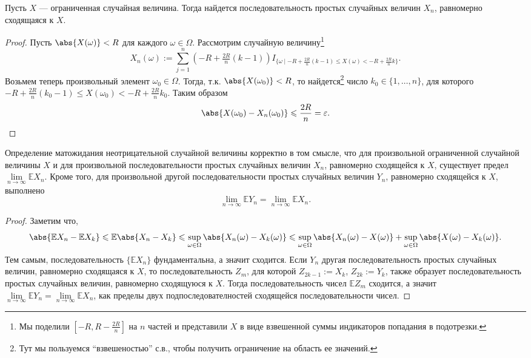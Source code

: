 \begin{lemma*}
    Пусть $X$ --- ограниченная случайная величина.
    Тогда найдется последовательность простых случайных величин $X_n$, равномерно сходящаяся к $X$.
\end{lemma*}

\begin{proof}
    Пусть $\abs{X(\omega)} < R$ для каждого $\omega \in \Omega$.
    Рассмотрим случайную величину\footnote{Мы поделили $[-R, R - \frac{2R}{n}]$ на $n$ частей и представили $X$ в виде взвешенной суммы индикаторов попадания в подотрезки.}
    \[
        X_n(\omega) := \sum_{j = 1}^{n}(-R + \tfrac{2R}{n}(k - 1)) I_{\{\omega \mid -R + \frac{2R}{n}(k - 1) \leqslant X(\omega)< -R + \frac{2R}{n} k\}}.
    \]
    Возьмем теперь произвольный элемент $\omega_0 \in \Omega$.
    Тогда, т.к. $\abs{X(\omega_0)} < R$, то найдется\footnote{Тут мы пользуемся \enquote{взвешеностью} с.в., чтобы получить ограничение на область ее значений.} число $k_0 \in \{1, \ldots, n \}$, для которого $-R + \frac{2R}{n}(k_0 - 1) \leqslant X(\omega_0) < -R + \frac{2R}{n} k_0$.
    Таким образом
    \[
        \abs{X(\omega_0) - X_n(\omega_0)} \leqslant \frac{2R}{n} = \varepsilon.
    \]
\end{proof}

\begin{proposal*}
    Определение матожидания неотрицательной случайной величины корректно в том смысле, что для произвольной ограниченной случайной величины $X$ и для произвольной последовательности простых случайных величин $X_n$, равномерно сходящейся к $X$, существует предел $\lim\limits_{n \to \infty} \mathbb{E} X_n$.
    Кроме того, для произвольной другой последовательности простых случайных величин $Y_n$, равномерно сходящейся к $X$, выполнено
    \[
        \lim\limits_{n \to \infty}\mathbb{E} Y_n = \lim\limits_{n \to \infty}\mathbb{E} X_n.
    \]
\end{proposal*}

\begin{proof}
    Заметим что,
    \[
        \abs{\mathbb{E} X_n - \mathbb{E} X_k} \leqslant \mathbb{E}\abs{X_n - X_k} \leqslant \sup\limits_{\omega \in \Omega}\abs{X_n(\omega) - X_k(\omega)} \leqslant \sup\limits_{\omega \in \Omega}\abs{X_n(\omega) - X(\omega)} + \sup\limits_{\omega \in \Omega}\abs{X(\omega) - X_k(\omega)}.
    \]
    Тем самым, последовательность $\{\mathbb{E}X_n\}$ фундаментальна, а значит сходится. Если $Y_n$ другая последовательность простых случайных величин, равномерно сходящаяся к $X$, то последовательность $Z_m$, для которой $Z_{2k - 1} := X_k$, $Z_{2k} := Y_k$, также образует последовательность простых случайных величин, равномерно сходящуюся к $X$.
    Тогда последовательность чисел $\mathbb{E}Z_m$ сходится, а значит $\lim\limits_{n \to \infty}\mathbb{E} Y_n = \lim\limits_{n \to \infty}\mathbb{E} X_n$, как пределы двух подпоследователностей сходящейся последовательности чисел.
\end{proof}


